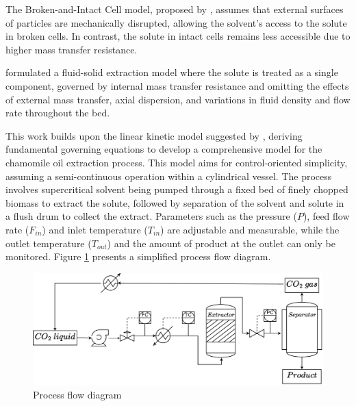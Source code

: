 \documentclass[../Article_Model_Parameters.tex]{subfiles}
\begin{document}
	The Broken-and-Intact Cell model, proposed by \citet{Sovova1994}, assumes that external surfaces of particles are mechanically disrupted, allowing the solvent's access to the solute in broken cells. In contrast, the solute in intact cells remains less accessible due to higher mass transfer resistance.
	
	\citet{Reverchon1996} formulated a fluid-solid extraction model where the solute is treated as a single component, governed by internal mass transfer resistance and omitting the effects of external mass transfer, axial dispersion, and variations in fluid density and flow rate throughout the bed.
	
	This work builds upon the linear kinetic model suggested by \citet{Reverchon1996}, deriving fundamental governing equations to develop a comprehensive model for the chamomile oil extraction process. This model aims for control-oriented simplicity, assuming a semi-continuous operation within a cylindrical vessel. The process involves supercritical solvent being pumped through a fixed bed of finely chopped biomass to extract the solute, followed by separation of the solvent and solute in a flush drum to collect the extract. Parameters such as the pressure ($P$), feed flow rate ($F_{in}$) and inlet temperature ($T_{in}$) are adjustable and measurable, while the outlet temperature ($T_{out}$) and the amount of product at the outlet can only be monitored. Figure \ref{fig: SFE_drawing} presents a simplified process flow diagram.
	
	\begin{figure}[!ht]
		\centering
		\includegraphics[width=\columnwidth]{Figures/PFD.drawio.pdf}
		\caption{Process flow diagram}
		\label{fig: SFE_drawing}
	\end{figure}
	
\end{document}
